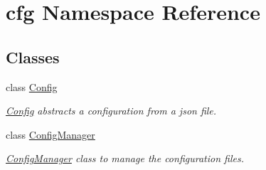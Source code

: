 \hypertarget{namespacecfg}{}\section{cfg Namespace Reference}
\label{namespacecfg}
\subsection*{Classes}
\begin{DoxyCompactItemize}
\item 
class \hyperlink{classcfg_1_1_config}{Config}
\begin{DoxyCompactList}\small\item\em \hyperlink{classcfg_1_1_config}{Config} abstracts a configuration from a json file. \end{DoxyCompactList}\item 
class \hyperlink{classcfg_1_1_config_manager}{Config\+Manager}
\begin{DoxyCompactList}\small\item\em \hyperlink{classcfg_1_1_config_manager}{Config\+Manager} class to manage the configuration files. \end{DoxyCompactList}\end{DoxyCompactItemize}
